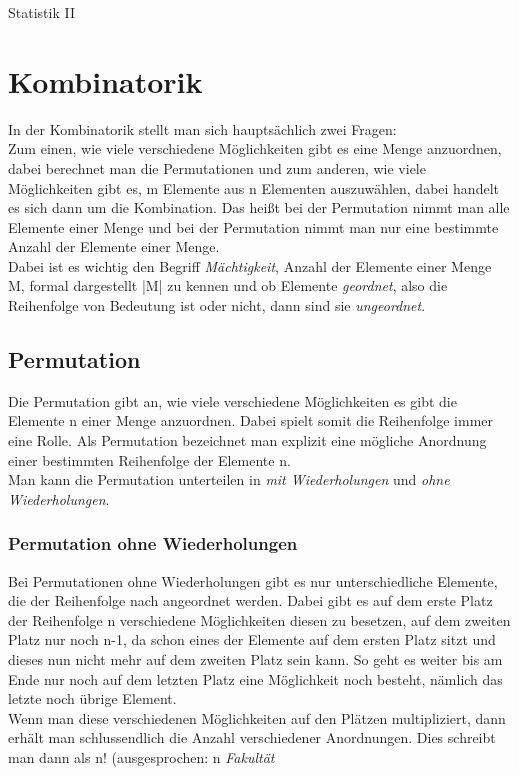 \documentclass[a4paper]{article}
\begin{document}
\clearpage

\hspace{0pt}
\vfill
\begin{center}
    {\Huge Statistik II}
\end{center}
\vfill
\hspace{0pt}

\clearpage


\section{Kombinatorik}
In der Kombinatorik stellt man sich hauptsächlich zwei Fragen: \\
Zum einen, wie viele verschiedene Möglichkeiten gibt es eine Menge anzuordnen, dabei berechnet man die Permutationen und zum anderen, wie viele Möglichkeiten gibt es, m Elemente aus n Elementen auszuwählen, dabei handelt es sich dann um die Kombination. Das heißt bei der Permutation nimmt man alle Elemente einer Menge und bei der Permutation nimmt man nur eine bestimmte Anzahl der Elemente einer Menge.\\
Dabei ist es wichtig den Begriff \textit{Mächtigkeit}, Anzahl der Elemente einer Menge M, formal dargestellt |M| zu kennen und ob Elemente \textit{geordnet}, also die Reihenfolge von Bedeutung ist oder nicht, dann sind sie \textit{ungeordnet}.

\subsection{Permutation}
Die Permutation gibt an, wie viele verschiedene Möglichkeiten es gibt die Elemente n einer Menge anzuordnen. Dabei spielt somit die Reihenfolge immer eine Rolle. Als Permutation bezeichnet man explizit eine mögliche Anordnung einer bestimmten Reihenfolge der Elemente n.\\
Man kann die Permutation unterteilen in \textit{mit Wiederholungen} und \textit{ohne Wiederholungen}.

\subsubsection{Permutation ohne Wiederholungen}
Bei Permutationen ohne Wiederholungen gibt es nur unterschiedliche Elemente, die der Reihenfolge nach angeordnet werden. Dabei gibt es auf dem erste Platz der Reihenfolge n verschiedene Möglichkeiten diesen zu besetzen, auf dem zweiten Platz nur noch n-1, da schon eines der Elemente auf dem ersten Platz sitzt und dieses nun nicht mehr auf dem zweiten Platz sein kann. So geht es weiter bis am Ende nur noch auf dem letzten Platz eine Möglichkeit noch besteht, nämlich das letzte noch übrige Element.\\
Wenn man diese verschiedenen Möglichkeiten auf den Plätzen multipliziert, dann erhält man schlussendlich die Anzahl verschiedener Anordnungen. Dies schreibt man dann als n! (ausgesprochen: n \textit{Fakultät}
\end{document}
